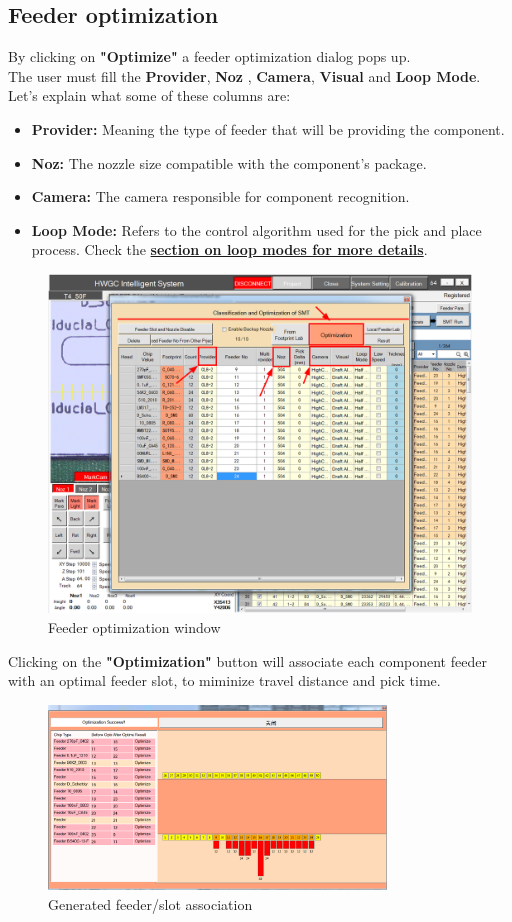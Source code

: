 \documentclass[a4paper,10pt]{report}
\begin{document}
\subsection{Feeder optimization}
By clicking on \textbf{"Optimize"} a feeder optimization dialog pops up.\\
The user must fill the \textbf{Provider}, \textbf{Noz} , \textbf{Camera}, \textbf{Visual} and \textbf{Loop Mode}. Let's explain what some of these columns are:
\begin{itemize}
 \item \textbf{Provider: } Meaning the type of feeder that will be providing the component.
 \item \textbf{Noz: } The nozzle size compatible with the component's package.
 \item \textbf{Camera: } The camera responsible for component recognition.
 \item \textbf{Loop Mode: } Refers to the control algorithm used for the pick and place process. Check the \textbf{\hyperref[sec:loop]{section on loop modes for more details}}.
\end{itemize}
\begin{figure}[!htb]
 \centering
 \includegraphics[width=1\textwidth]{images/scrot18.png}
 \caption{Feeder optimization window}
\end{figure}
Clicking on the \textbf{"Optimization"} button will associate each component feeder with an optimal feeder slot, to miminize travel distance and pick time.
\newpage
\begin{figure}[!htb]
 \centering
 \includegraphics[width=0.8\textwidth]{images/scrot19.png}
 \caption{Generated feeder/slot association}
\end{figure}
\end{document}
